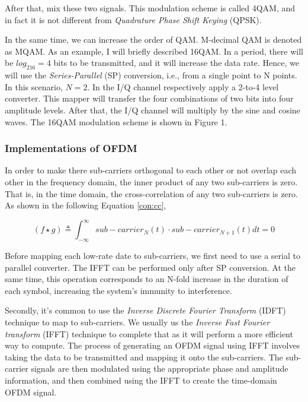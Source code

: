 \documentclass{article}
\numberwithin{figure}{section}
\numberwithin{equation}{section}
\begin{document}
After that, mix these two signals. This modulation scheme is called 4QAM, and in fact it is not different from \textit{Quadrature Phase Shift Keying} (QPSK).

In the same time, we can increase the order of QAM. M-decimal QAM is denoted as MQAM. As an example, I will briefly described 16QAM. In a period, there will be $log_216=4$ bits to be transmitted, and it will increase the data rate. Hence, we will use the \textit{Series-Parallel} (SP) conversion, i.e., from a single point to N points. In this scenario, $N=2$. In the I/Q channel respectively apply a 2-to-4 level converter. This mapper will transfer the four combinations of two bits into four amplitude levels. After that, the I/Q channel will multiply by the sine and cosine waves. The 16QAM modulation scheme is shown in Figure 1.

\subsubsection{Implementations of OFDM}

In order to make there sub-carriers orthogonal to each other or not overlap each other in the frequency domain, the inner product of any two sub-carriers is zero. That is, in the time domain, the cross-correlation of any two sub-carriers is zero. As shown in the following Equation \ref{con:cc},

\begin{equation}
(f \star g) \triangleq \int_{-\infty}^{\infty} sub-carrier_N(t) \cdot sub-carrier_{N+1}(t)dt=0 \label{con:cc}
\end{equation}

Before mapping each low-rate date to sub-carriers, we first need to use a serial to parallel converter. The IFFT can be performed only after SP conversion. At the same time, this operation corresponds to an N-fold increase in the duration of each symbol, increasing the system's immunity to interference.

Secondly, it's common to use the \textit{Inverse Discrete Fourier Transform} (IDFT) technique to map to sub-carriers. We usually us the \textit{Inverse Fast Fourier transform} (IFFT) technique to complete that as it will perform a more efficient way to compute. The process of generating an OFDM signal using IFFT involves taking the data to be transmitted and mapping it onto the sub-carriers. The sub-carrier signals are then modulated using the appropriate phase and amplitude information, and then combined using the IFFT to create the time-domain OFDM signal. 
\end{document}

